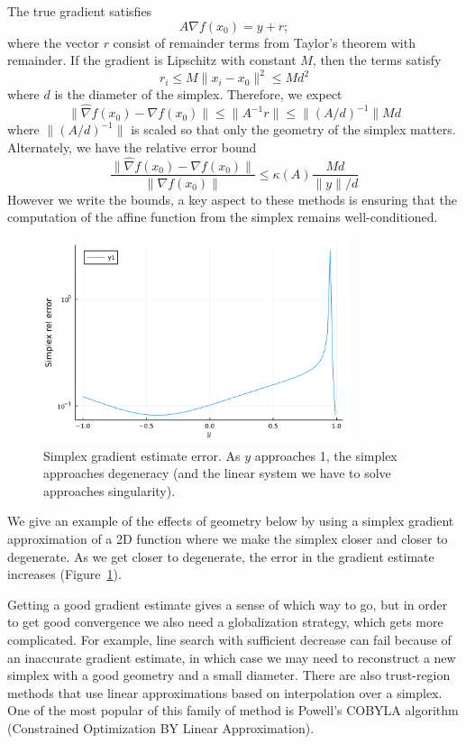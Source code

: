 \documentclass[12pt, leqno]{article} %
\begin{document}
The true gradient satisfies \[A \nabla f(x_0) = y + r;\] where the
vector \(r\) consist of remainder terms from Taylor's theorem with
remainder. If the gradient is Lipschitz with constant \(M\), then the
terms satisfy \[r_i \leq M \|x_i-x_0\|^2 \leq M d^2\] where \(d\) is the
diameter of the simplex. Therefore, we expect
\[\|\hat{\nabla} f(x_0) - \nabla f(x_0)\| \leq 
  \|A^{-1} r\| \leq \|(A/d)^{-1}\| Md\] where \(\|(A/d)^{-1}\|\) is
scaled so that only the geometry of the simplex matters. Alternately, we
have the relative error bound
\[\frac{\|\hat{\nabla} f(x_0) - \nabla f(x_0)\|}{\|\nabla f(x_0)\|} \leq 
  \kappa(A) \frac{Md}{\|y\|/d}\] However we write the bounds, a key
aspect to these methods is ensuring that the computation of the affine
function from the simplex remains well-conditioned.

\begin{figure}
\begin{center}
\includegraphics[width=0.8\textwidth]{fig/2023-05-01-simplex-err.pdf}
\end{center}
\caption{Simplex gradient estimate error.  As $y$ approaches 1, the simplex
  approaches degeneracy (and the linear system we have to solve approaches
  singularity).}
\label{fig:simplex-err}
\end{figure}

We give an example of the effects of geometry below by using a simplex
gradient approximation of a 2D function where we make the simplex closer
and closer to degenerate.  As we get closer to degenerate, the error in
the gradient estimate increases (Figure~\ref{fig:simplex-err}).

Getting a good gradient estimate gives a sense of which way to go, but
in order to get good convergence we also need a globalization strategy,
which gets more complicated. For example, line search with sufficient
decrease can fail because of an inaccurate gradient estimate, in which
case we may need to reconstruct a new simplex with a good geometry and a
small diameter. There are also trust-region methods that use linear
approximations based on interpolation over a simplex. One of the most
popular of this family of method is Powell's COBYLA algorithm
(Constrained Optimization BY Linear Approximation).
\end{document}
